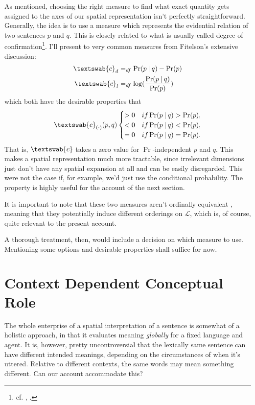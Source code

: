 \documentclass[11pt, a4paper]{scrartcl}
\renewcommand{\i}[1]{\emph{#1}}
\renewcommand{\L}{\mathcal{L}}
\newcommand{\m}[1]{\textswab{#1}}
\newcommand{\given}[1][]{\:#1\vert\:}
\begin{document}
As mentioned, choosing the right measure to find what exact quantity gets assigned to the axes of our spatial representation isn't perfectly straightforward. Generally, the idea is to use a measure which represents the evidential relation of two sentences $p$ and $q$. This is closely related to what is usually called degree of confirmation\footnote{cf. \textcite{Fitelson1999-FITTPO-3}, \textcite{Broessel2013}.}. I'll present to very common measures from Fitelson's extensive discussion: 
\begin{align*}
    \m{c}_d &=_{df} \Pr(p\given q) - \Pr(p)\\
    \m{c}_l &=_{df} \log(\frac{\Pr(p\given q)}{\Pr(p)})
\end{align*}
which both have the desirable properties that
\[
\m{c}_{(\cdot)}(p, q) 
    \begin{cases} 
        > 0 & if \Pr(p \given q) > \Pr(p),\\
        < 0 & if \Pr(p \given q) < \Pr(p),\\
        = 0 & if \Pr(p \given q) = \Pr(p).
    \end{cases}
\]
That is, $\m{c}$ takes a zero value for $\Pr$-independent $p$ and $q$. This makes a spatial representation much more tractable, since irrelevant dimensions just don't have any spatial expansion at all and can be easily disregarded. This were not the case if, for example, we'd just use the conditional probability. The property is highly useful for the account of the next section. 

It is important to note that these two measures aren't ordinally equivalent \parencite[364]{Fitelson1999-FITTPO-3}, meaning that they potentially induce different orderings on $\L$, which is, of course, quite relevant to the present account.

A thorough treatment, then, would include a decision on which measure to use. Mentioning some options and desirable properties shall suffice for now. 

\section{Context Dependent Conceptual Role}

The whole enterprise of a spatial interpretation of a sentence is somewhat of a holistic approach, in that it evaluates meaning \i{globally} for a fixed language and agent. It is, however, pretty uncontroversial that the lexically same sentence can have different intended meanings, depending on the circumstances of when it's uttered. Relative to different contexts, the same words may mean something different. Can our account accommodate this? 
\end{document}

